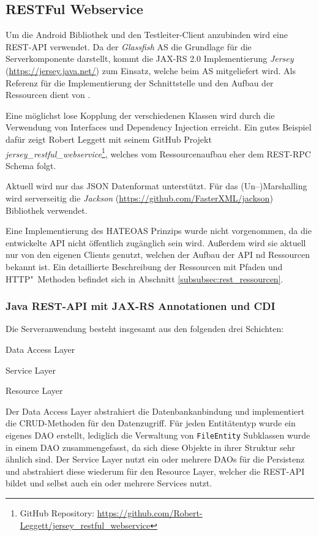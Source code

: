 \subsection{RESTFul Webservice}
Um die Android Bibliothek und den Testleiter-Client anzubinden wird eine \ac{REST}-\ac{API} verwendet.
Da der \emph{Glassfish} \ac{AS} die Grundlage für die Serverkomponente darstellt, kommt die \ac{JAX-RS} 2.0 Implementierung \emph{Jersey} (\url{https://jersey.java.net/}) zum Einsatz, welche beim \ac{AS} mitgeliefert wird.
Als Referenz für die Implementierung der Schnittstelle und den Aufbau der Ressourcen dient  von \citeauthor{Burke.2014} \cite{Burke.2014}.

Eine möglichst lose Kopplung der verschiedenen Klassen wird durch die Verwendung von Interfaces und Dependency Injection erreicht.
Ein gutes Beispiel dafür zeigt Robert Leggett mit seinem GitHub Projekt \emph{jersey\_restful\_webservice}\footnote{GitHub Repository: \url{https://github.com/Robert-Leggett/jersey_restful_webservice}}, welches vom Ressourcenaufbau eher dem \ac{REST}-\ac{RPC} Schema folgt.

Aktuell wird nur das \ac{JSON} Datenformat unterstützt.
Für das (Un--)Marshalling wird serverseitig die \emph{Jackson} (\url{https://github.com/FasterXML/jackson}) Bibliothek verwendet.

Eine Implementierung des \ac{HATEOAS} Prinzips \cite[vgl.][11-13]{Burke.2014} wurde nicht vorgenommen, da die entwickelte \ac{API} nicht öffentlich zugänglich sein wird.
Außerdem wird sie aktuell nur von den eigenen Clients genutzt, welchen der Aufbau der \ac{API} nd Ressourcen bekannt ist.
Ein detaillierte Beschreibung der Ressourcen mit Pfaden und \ac{HTTP}"~Methoden befindet sich in Abschnitt \ref{subsubsec:rest_ressourcen}.

\subsubsection{Java REST-API mit JAX-RS Annotationen und CDI}
Die Serveranwendung besteht insgesamt aus den folgenden drei Schichten:
\begin{compactenum}
	\item Data Access Layer
	\item Service Layer
	\item Resource Layer
\end{compactenum}
Der Data Access Layer abstrahiert die Datenbankanbindung und implementiert die \ac{CRUD}-Methoden für den Datenzugriff.
Für jeden Entitätentyp wurde ein eigenes \ac{DAO} erstellt, lediglich die Verwaltung von \texttt{FileEntity} Subklassen wurde in einem \ac{DAO} zusammengefasst, da sich diese Objekte in ihrer Struktur sehr ähnlich sind.
Der Service Layer nutzt ein oder mehrere \acp{DAO} für die Persistenz und abstrahiert diese wiederum für den Resource Layer, welcher die \ac{REST}-\ac{API} bildet und selbst auch ein oder mehrere Services nutzt.

